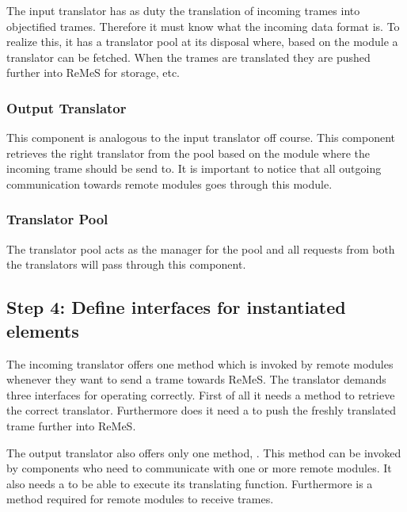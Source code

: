 \npar The input translator has as duty the translation of incoming trames into
objectified trames. Therefore it must know what the incoming data format is.
To realize this, it has a translator pool at its disposal where, based on the
module a translator can be fetched. When the trames are translated they are
pushed further into ReMeS for storage, etc.


\subsubsection{Output Translator}

\npar This component is analogous to the input translator off course. This
component retrieves the right translator from the pool based on the module
where the incoming trame should be send to. It is important to notice that all
outgoing communication towards remote modules goes through this module.

\subsubsection{Translator Pool}

\npar The translator pool acts as the manager for the pool and all requests from
both the translators will pass through this component. 

\subsection{Step 4: Define interfaces for instantiated elements}
\label{add:it2/interfaces}

\npar The incoming translator offers one method 
which is invoked by remote modules whenever they want to send a trame towards
ReMeS. The translator demands three interfaces for operating correctly. First of
all it needs a  method to retrieve the correct
translator. Furthermore does it need a  to
push the freshly translated trame further into ReMeS. 


\npar The output translator also offers only one method, .
This method can be invoked by components who need to communicate with one or
more remote modules. It also needs a  to
be able to execute its translating function. Furthermore is a
 method required for remote modules to receive trames. 

